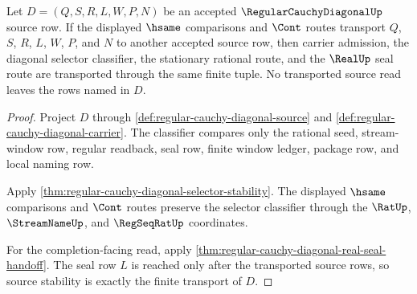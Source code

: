 \begin{theorem}
\label{thm:regular-cauchy-diagonal-source-stability-obligation}
Let $D=(Q,S,R,L,W,P,N)$ be an accepted $\RegularCauchyDiagonalUp$ source row. If the displayed $\hsame$ comparisons and $\Cont$ routes transport $Q$, $S$, $R$, $L$, $W$, $P$, and $N$ to another accepted source row, then carrier admission, the diagonal selector classifier, the stationary rational route, and the $\RealUp$ seal route are transported through the same finite tuple. No transported source read leaves the rows named in $D$.
\end{theorem}
\begin{proof}
Project $D$ through \autoref{def:regular-cauchy-diagonal-source} and \autoref{def:regular-cauchy-diagonal-carrier}. The classifier compares only the rational seed, stream-window row, regular readback, seal row, finite window ledger, package row, and local naming row.

Apply \autoref{thm:regular-cauchy-diagonal-selector-stability}. The displayed $\hsame$ comparisons and $\Cont$ routes preserve the selector classifier through the $\RatUp$, $\StreamNameUp$, and $\RegSeqRatUp$ coordinates.

For the completion-facing read, apply \autoref{thm:regular-cauchy-diagonal-real-seal-handoff}. The seal row $L$ is reached only after the transported source rows, so source stability is exactly the finite transport of $D$.
\end{proof}

